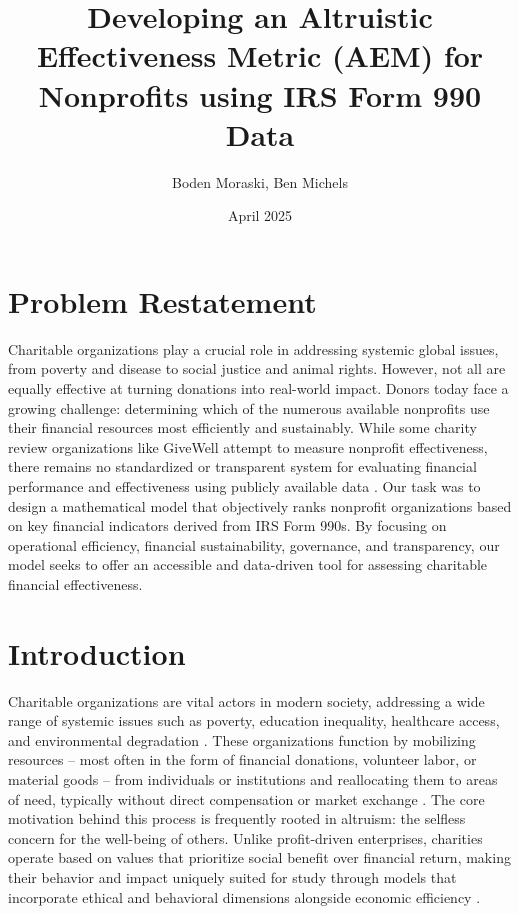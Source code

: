 \documentclass[12pt]{article}
\title{Developing an Altruistic Effectiveness Metric (AEM) for Nonprofits using IRS Form 990 Data} %
\author{Boden Moraski, Ben Michels} %
\date{April 2025} %
\begin{document}
\maketitle

\section{Problem Restatement} %
Charitable organizations play a crucial role in addressing systemic global issues, from poverty and disease to social justice and animal rights. However, not all are equally effective at turning donations into real-world impact. Donors today face a growing challenge: determining which of the numerous available nonprofits use their financial resources most efficiently and sustainably. While some charity review organizations like GiveWell attempt to measure nonprofit effectiveness, there remains no standardized or transparent system for evaluating financial performance and effectiveness using publicly available data \cite{propublica_explorer}. Our task was to design a mathematical model that objectively ranks nonprofit organizations based on key financial indicators derived from IRS Form 990s. By focusing on operational efficiency, financial sustainability, governance, and transparency, our model seeks to offer an accessible and data-driven tool for assessing charitable financial effectiveness.

\section{Introduction} %
Charitable organizations are vital actors in modern society, addressing a wide range of systemic issues such as poverty, education inequality, healthcare access, and environmental degradation \cite{https://doi.org/10.1002/nml.21143}. These organizations function by mobilizing resources – most often in the form of financial donations, volunteer labor, or material goods – from individuals or institutions and reallocating them to areas of need, typically without direct compensation or market exchange \cite{weisbrod1998}. The core motivation behind this process is frequently rooted in altruism: the selfless concern for the well-being of others. Unlike profit-driven enterprises, charities operate based on values that prioritize social benefit over financial return, making their behavior and impact uniquely suited for study through models that incorporate ethical and behavioral dimensions alongside economic efficiency \cite{gee2023}.
\end{document}
